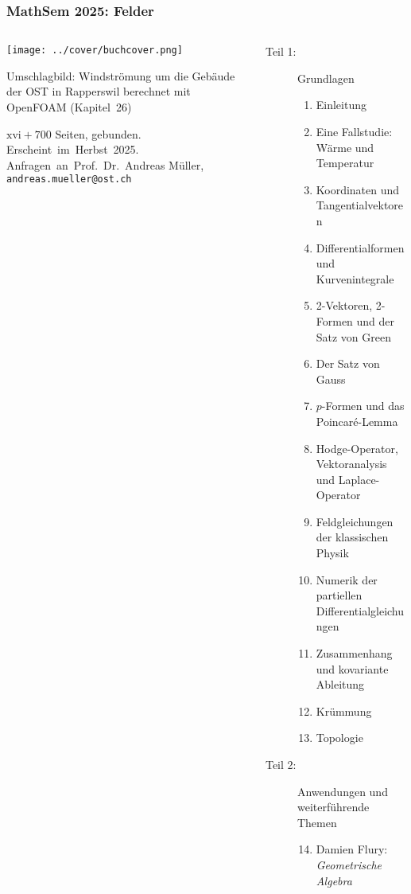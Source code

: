 \documentclass[handout]{beamer}
\title[]{}
\begin{document}
\begin{frame}
\frametitle{%
MathSem 2025: Felder}
\vspace*{-0.1cm}
\begin{columns}[t,onlytextwidth]
\begin{column}{0.37\textwidth}
\begin{center}
\texttt{[image: ../cover/buchcover.png]}
\end{center}
\bigskip
Umschlagbild: Windströmung um die Gebäude der OST in Rapperswil
berechnet mit OpenFOAM (Kapitel~26)
\bigskip
\bigskip

$\text{xvi} + 700$ Seiten, gebunden.
Erscheint~im~Herbst~2025.\\
Anfragen~an~Prof.~Dr.~Andreas Müller,\\
{\texttt{andreas.mueller@ost.ch}}
\bigskip
\bigskip
\bigskip
\end{column}
%
\begin{column}{0.60\textwidth}
\begin{description}
\item[Teil 1:] Grundlagen
\begin{enumerate}
\item Einleitung
\item Eine Fallstudie: Wärme und Temperatur
\item Koordinaten und Tangentialvektoren
\item Differentialformen und Kurvenintegrale
\item 2-Vektoren, 2-Formen und der Satz von Green
\item Der Satz von Gauss
\item $p$-Formen und das Poincaré-Lemma
\item Hodge-Operator, Vektoranalysis und Laplace-Operator
\item Feldgleichungen der klassischen Physik
\item Numerik der partiellen Differentialgleichungen
\item Zusammenhang und kovariante Ableitung
\item Krümmung
\item Topologie
\end{enumerate}
\item[Teil 2:] Anwendungen und weiterführende Themen
\begin{enumerate}
\setcounter{enumi}{13}
\item Damien Flury: {\em Geometrische Algebra}

\end{enumerate}
\end{description}
\end{column}
\end{columns}
\end{frame}
\end{document}
